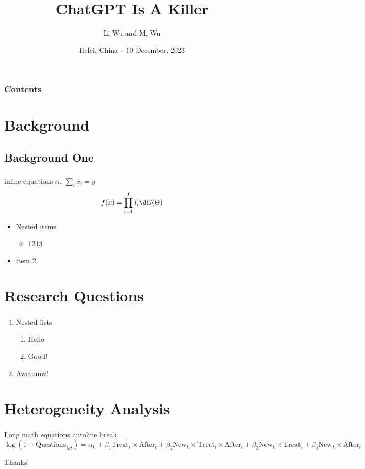 \documentclass{mybeamer}
\title{ChatGPT Is A Killer}
\author{Li Wu and M, Wu}
\date{Hefei, China -- 10 December, 2023}
\makeatletter
\newcommand*{\currentname}{\@currentlabelname} %
\makeatother
\begin{document}
\frame{\titlepage}

\begin{frame}
	\frametitle{Contents}
	\tableofcontents
\end{frame}

\section{Background}
\subsection{Background One}
\begin{frame}
	\frametitle{\currentname}


	inline equations \(\alpha\), \(\sum_i x_i = y\)
	\begin{equation*}
		f(x) = \prod_{i=1}^I l_i\d G(\Theta)
	\end{equation*}
	\begin{itemize}
		\item Nested items
		      \begin{itemize}
			      \item 1213
		      \end{itemize}
		\item item 2
	\end{itemize}
\end{frame}
\section{Research Questions}
\begin{frame}
	\frametitle{\currentname}
	\begin{enumerate}
		\item Nested lists
		      \begin{enumerate}
			      \item Hello
			      \item Good! 
		      \end{enumerate}
		\item Awesomw! 
	\end{enumerate}

\end{frame}
\section{Heterogeneity Analysis}
\begin{frame}
	\frametitle{\currentname}
	Long math equations autoline break
	\begin{dmath*}
		\log(1 + \mathrm{Questions}_{ikt}) = \alpha_k + \beta_1\mathrm{Treat}_i \times \mathrm{After}_t + \beta_2 \mathrm{New}_{k} \times \mathrm{Treat}_i \times \mathrm{After}_t + \beta_3\mathrm{New}_{k} \times \mathrm{Treat}_i + \beta_4\mathrm{New}_{k} \times \mathrm{After}_t
	\end{dmath*}
\end{frame}

\begin{frame}[c]
	\centering \HUGE Thanks! 
\end{frame}
\end{document}
